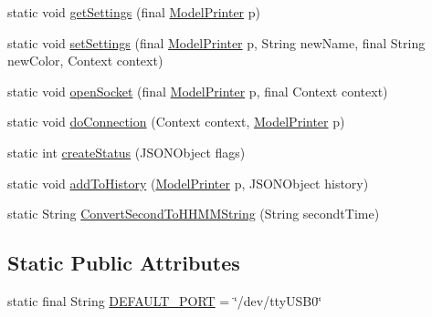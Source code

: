 \begin{DoxyCompactItemize}
\item 
static void \hyperlink{classandroid_1_1app_1_1printerapp_1_1octoprint_1_1_octoprint_connection_aff0110477d72e6f2618f0cf0561f6b57}{get\+Settings} (final \hyperlink{classandroid_1_1app_1_1printerapp_1_1model_1_1_model_printer}{Model\+Printer} p)
\item 
static void \hyperlink{classandroid_1_1app_1_1printerapp_1_1octoprint_1_1_octoprint_connection_a6890bc490ac28e4c7929ed68b8a54dc3}{set\+Settings} (final \hyperlink{classandroid_1_1app_1_1printerapp_1_1model_1_1_model_printer}{Model\+Printer} p, String new\+Name, final String new\+Color, Context context)
\item 
static void \hyperlink{classandroid_1_1app_1_1printerapp_1_1octoprint_1_1_octoprint_connection_a5e4e16d3f4131c9fac795d701d6856ea}{open\+Socket} (final \hyperlink{classandroid_1_1app_1_1printerapp_1_1model_1_1_model_printer}{Model\+Printer} p, final Context context)
\item 
static void \hyperlink{classandroid_1_1app_1_1printerapp_1_1octoprint_1_1_octoprint_connection_a44dc057c8bf6560949ce5d8abbcfd9bc}{do\+Connection} (Context context, \hyperlink{classandroid_1_1app_1_1printerapp_1_1model_1_1_model_printer}{Model\+Printer} p)
\item 
static int \hyperlink{classandroid_1_1app_1_1printerapp_1_1octoprint_1_1_octoprint_connection_a5d696d93278124ade54d8a24279d664f}{create\+Status} (J\+S\+O\+N\+Object flags)
\item 
static void \hyperlink{classandroid_1_1app_1_1printerapp_1_1octoprint_1_1_octoprint_connection_a8205b26c7a35d0530e4fb36748ba4ca9}{add\+To\+History} (\hyperlink{classandroid_1_1app_1_1printerapp_1_1model_1_1_model_printer}{Model\+Printer} p, J\+S\+O\+N\+Object history)
\item 
static String \hyperlink{classandroid_1_1app_1_1printerapp_1_1octoprint_1_1_octoprint_connection_aeeec4075b1388619a0573f9d3e89aef9}{Convert\+Second\+To\+H\+H\+M\+M\+String} (String secondt\+Time)
\end{DoxyCompactItemize}
\subsection*{Static Public Attributes}
\begin{DoxyCompactItemize}
\item 
static final String \hyperlink{classandroid_1_1app_1_1printerapp_1_1octoprint_1_1_octoprint_connection_aa75c1a4b840d111cfe50a36d28763b0e}{D\+E\+F\+A\+U\+L\+T\+\_\+\+P\+O\+RT} = \char`\"{}/dev/tty\+U\+S\+B0\char`\"{}
\end{DoxyCompactItemize}


